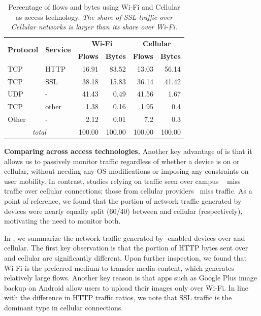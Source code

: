 


\begin{table}
\begin{center}
\begin{tabular}{|l|l|r|r|r|r|}
\hline
\multirow{2}{*}{\bf Protocol} & \multirow{2}{*}{\bf Service} & \multicolumn{2}{|c|}{\bf Wi-Fi} & \multicolumn{2}{|c|}{\bf Cellular} \tabularnewline
\cline{3-6}
           &           &  \textbf{Flows}  &  \textbf{Bytes}  &  \textbf{Flows}  &  \textbf{Bytes}  \tabularnewline
\hline
 TCP       &  HTTP     &  16.91  &  83.52  &  13.03  &  56.14  \tabularnewline
\hline
 TCP       &  SSL      &  38.18  &  15.83  &  36.14  &  41.42  \tabularnewline
\hline
UDP       &  -        &  41.43  &   0.49  &  41.56  &   1.67  \tabularnewline
\hline
TCP       &  other    &   1.38 &   0.16  &   1.95  &   0.4  \tabularnewline
\hline
Other     &  -        &   2.12  &  0.01  &   7.2  &   0.3  \tabularnewline
\hline
\multicolumn{2}{|c|}{\emph{total}} & 100.00 & 100.00 & 100.00 & 100.00 \tabularnewline
\hline
\end{tabular}
\end{center}
\caption{Percentage of flows and bytes using Wi-Fi and Cellular as access technology.  \emph{The share of SSL traffic over Cellular
    networks is larger than its share over Wi-Fi.}}  
\label{tab:summaryWifiCellularTraffic}
\end{table}


\noindent\textbf{Comparing across access technologies.} Another 
key advantage of \meddle is that it allows us to passively monitor traffic 
regardless of whether a device is on \wifi or cellular, without 
needing any OS modifications or imposing any constraints on 
user mobility. In contrast, studies relying on traffic seen over campus \wifi~\cite{chen:wifi} miss traffic 
over cellular connections; those from cellular providers~\cite{gerber:passivespeed} miss \wifi traffic. 
As a point of reference, we found that the portion of network traffic  
generated by devices were nearly equally split (60/40) between 
\wifi and cellular (respectively), motivating the need to monitor both.

In , we summarize the network 
traffic generated by \meddle-enabled devices over \wifi and cellular.
The first key observation is that the portion of HTTP bytes sent over \wifi and cellular 
are significantly different. Upon further inspection, we found that Wi-Fi is the
preferred medium to transfer media content, which generates relatively large flows. 
Another key reason is that apps such as
Google Plus image backup on Android allow users to upload their
images only over Wi-Fi. In line with the difference in HTTP traffic ratios, we 
note that SSL traffic is the dominant type in cellular connections.

